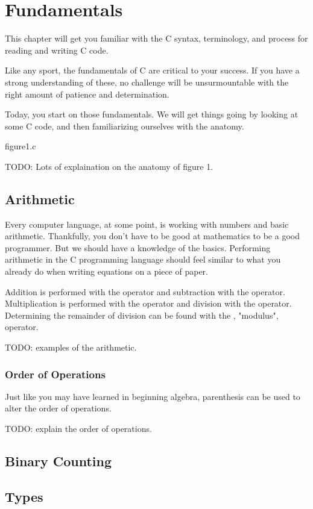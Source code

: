 \chapter{Fundamentals}

This chapter will get you familiar with the C syntax, terminology, and
process for reading and writing C code.

Like any sport, the fundamentals of C are critical to your success. If you have
a strong understanding of these, no challenge will be unsurmountable with the
right amount of patience and determination.

Today, you start on those fundamentals. We will get things going by looking at
some C code, and then familiarizing ourselves with the anatomy.


\begin{code}{figure1.c}

\end{code}


TODO: Lots of explaination on the anatomy of figure 1.


\section{Arithmetic}

Every computer language, at some point, is working with numbers and basic
arithmetic. Thankfully, you don't have to be good at mathematics to be a good
programmer. But we should have a knowledge of the basics. Performing arithmetic
in the C programming language should feel similar to what you already do when
writing equations on a piece of paper.

Addition is performed with the \ident{+} operator and subtraction with the
\ident{-} operator. Multiplication is performed with the \ident{*} operator and
division with the \ident{/} operator. Determining the remainder of division can
be found with the \ident{\%}, "modulus", operator.

TODO: examples of the arithmetic.

\subsection{Order of Operations}

Just like you may have learned in beginning algebra, parenthesis can be used
to alter the order of operations.

TODO: explain the order of operations.

\section{Binary Counting}

\section{Types}
